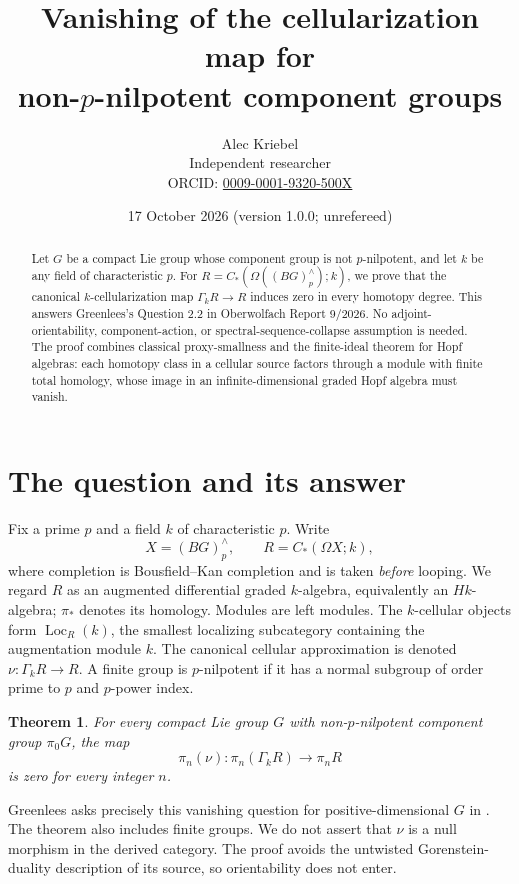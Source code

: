 \documentclass[11pt]{article}
\title{Vanishing of the cellularization map for\\non-\(p\)-nilpotent component groups}
\author{Alec Kriebel\\
\small Independent researcher\\
\small ORCID: \href{https://orcid.org/0009-0001-9320-500X}{0009-0001-9320-500X}}
\date{17 October 2026 \quad (version 1.0.0; unrefereed)}
\newtheorem{theorem}{Theorem}
\newcommand{\Loc}{\operatorname{Loc}}
\newcommand{\Gam}{\Gamma_k}
\begin{document}
\maketitle
\begin{abstract}
Let \(G\) be a compact Lie group whose component group is not \(p\)-nilpotent, and let \(k\) be any field of characteristic \(p\). For \(R=C_*(\Omega((BG)^\wedge_p);k)\), we prove that the canonical \(k\)-cellularization map \(\Gamma_kR\to R\) induces zero in every homotopy degree. This answers Greenlees's Question 2.2 in Oberwolfach Report 9/2026. No adjoint-orientability, component-action, or spectral-sequence-collapse assumption is needed. The proof combines classical proxy-smallness and the finite-ideal theorem for Hopf algebras: each homotopy class in a cellular source factors through a module with finite total homology, whose image in an infinite-dimensional graded Hopf algebra must vanish.
\end{abstract}

\section{The question and its answer}

Fix a prime \(p\) and a field \(k\) of characteristic \(p\). Write
\[
X=(BG)^\wedge_p,\qquad R=C_*(\Omega X;k),
\]
where completion is Bousfield--Kan completion and is taken \emph{before} looping. We regard \(R\) as an augmented differential graded \(k\)-algebra, equivalently an \(Hk\)-algebra; \(\pi_*\) denotes its homology. Modules are left modules. The \(k\)-cellular objects form \(\Loc_R(k)\), the smallest localizing subcategory containing the augmentation module \(k\). The canonical cellular approximation is denoted \(\nu:\Gam R\to R\). A finite group is \(p\)-nilpotent if it has a normal subgroup of order prime to \(p\) and \(p\)-power index.

\begin{theorem}\label{thm:main}
For every compact Lie group \(G\) with non-\(p\)-nilpotent component group \(\pi_0G\), the map
\[
\pi_n(\nu):\pi_n(\Gam R)\longrightarrow\pi_nR
\]
is zero for every integer \(n\).
\end{theorem}

Greenlees asks precisely this vanishing question for positive-dimensional \(G\) in \cite[Question 2.2, p.~594]{OWR}. The theorem also includes finite groups. We do not assert that \(\nu\) is a null morphism in the derived category. The proof avoids the untwisted Gorenstein-duality description of its source, so orientability does not enter.
\end{document}
